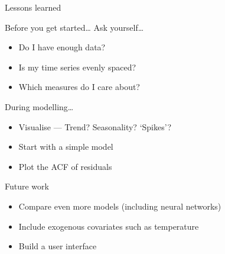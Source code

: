\documentclass[12pt,aspectratio=169]{beamer}
\begin{document}
\begin{frame}{Lessons learned}
\end{frame}

\begin{frame}{Before you get started\ldots}
    Ask yourself\ldots
    \begin{itemize}[<+->]
        \setlength{\itemsep}{1em}
        \item Do I have \alert<1>{enough data}?
        \item Is my time series \alert<2>{evenly spaced}?
        \item Which \alert<3>{measures} do I care about?
    \end{itemize}
\end{frame}

\begin{frame}{During modelling\ldots}
    \begin{itemize}[<+->]
        \setlength{\itemsep}{1em}
        \item \alert<1>{Visualise} --- Trend? Seasonality? `Spikes'?
        \item Start with a \alert<2>{simple} model
        \item \alert<3>{Plot the ACF of residuals}
    \end{itemize}
\end{frame}

\begin{frame}{Future work}
    \begin{itemize}
        \setlength{\itemsep}{1em}
        \item Compare even more models (including neural networks)
        \item Include exogenous covariates such as temperature
        \item Build a user interface
    \end{itemize}
\end{frame}
\end{document}
